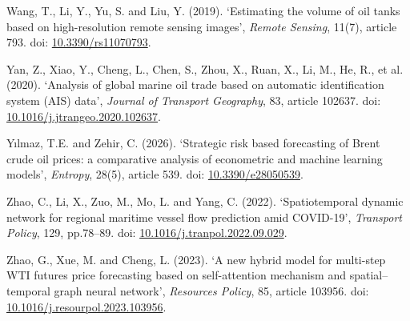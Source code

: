 \documentclass[
  british,
  12pt,
  oneside]{book}
\newlength{\cslhangindent}
\newenvironment{CSLReferences}[2] %
 {\begin{list}{}{%
  \setlength{\itemindent}{0pt}
  \setlength{\leftmargin}{0pt}
  \setlength{\parsep}{0pt}
  \ifodd #1
   \setlength{\leftmargin}{\cslhangindent}
   \setlength{\itemindent}{-1\cslhangindent}
  \fi
  \setlength{\itemsep}{#2\baselineskip}}}
 {\end{list}}
\begin{document}
\begin{CSLReferences}{0}{1}
Wang, T., Li, Y., Yu, S. and Liu, Y. (2019). {`{Estimating the volume of oil tanks based on high-resolution remote sensing images}'}, \emph{Remote Sensing}, 11(7), article 793. doi: \href{https://doi.org/10.3390/rs11070793}{10.3390/rs11070793}.

Yan, Z., Xiao, Y., Cheng, L., Chen, S., Zhou, X., Ruan, X., Li, M., He, R., et al. (2020). {`{Analysis of global marine oil trade based on automatic identification system ({AIS}) data}'}, \emph{Journal of Transport Geography}, 83, article 102637. doi: \href{https://doi.org/10.1016/j.jtrangeo.2020.102637}{10.1016/j.jtrangeo.2020.102637}.

Yılmaz, T.E. and Zehir, C. (2026). {`{Strategic risk based forecasting of {Brent} crude oil prices: a comparative analysis of econometric and machine learning models}'}, \emph{Entropy}, 28(5), article 539. doi: \href{https://doi.org/10.3390/e28050539}{10.3390/e28050539}.

Zhao, C., Li, X., Zuo, M., Mo, L. and Yang, C. (2022). {`{Spatiotemporal dynamic network for regional maritime vessel flow prediction amid {COVID}-19}'}, \emph{Transport Policy}, 129, pp.78--89. doi: \href{https://doi.org/10.1016/j.tranpol.2022.09.029}{10.1016/j.tranpol.2022.09.029}.

Zhao, G., Xue, M. and Cheng, L. (2023). {`{A new hybrid model for multi-step {WTI} futures price forecasting based on self-attention mechanism and spatial--temporal graph neural network}'}, \emph{Resources Policy}, 85, article 103956. doi: \href{https://doi.org/10.1016/j.resourpol.2023.103956}{10.1016/j.resourpol.2023.103956}.

\end{CSLReferences}
\end{document}
